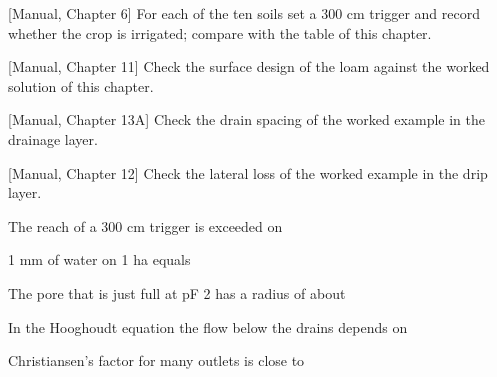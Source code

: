 \begin{exlist}
\item {\color{khblue}[Manual, Chapter 6]} For each of the ten soils set a 300 cm trigger and record whether the crop is irrigated; compare with the table of this chapter.\par{}
\item {\color{khblue}[Manual, Chapter 11]} Check the surface design of the loam against the worked solution of this chapter.\par{}
\item {\color{khblue}[Manual, Chapter 13A]} Check the drain spacing of the worked example in the drainage layer.\par{}
\item {\color{khblue}[Manual, Chapter 12]} Check the lateral loss of the worked example in the drip layer.\par{}
\end{exlist}
\begin{exlist}
\item The reach of a 300 cm trigger is exceeded on
\item 1 mm of water on 1 ha equals
\item The pore that is just full at pF 2 has a radius of about
\item In the Hooghoudt equation the flow below the drains depends on
\item Christiansen's factor for many outlets is close to
\end{exlist}
